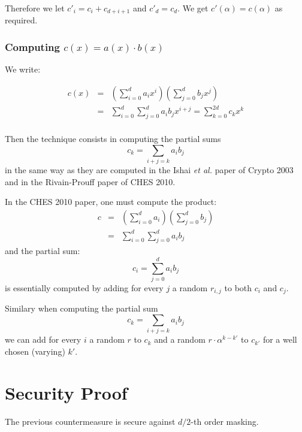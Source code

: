 \documentclass[11pt]{article}
\begin{document}
Therefore we let $c'_i=c_i+c_{d+i+1}$ and $c'_d=c_d$. We get
$c'(\alpha)=c(\alpha)$ as required.

\subsubsection{Computing $c(x)=a(x) \cdot b(x)$}

We write:

\begin{eqnarray*}
c(x) & =& \left(\sum\limits_{i=0}^d a_i x^i \right)
\left(\sum\limits_{j=0}^d b_j x^j \right) \\
& = & \sum\limits_{i=0}^d \sum\limits_{j=0}^d a_i b_j
x^{i+j}=\sum\limits_{k=0}^{2d} c_k x^k\\
\end{eqnarray*}

Then the technique consists in computing the partial sums
$$ c_k=\sum\limits_{i+j=k} a_i b_j $$
in the same way as they are computed in the Ishai {\sl et al.} paper
of Crypto 2003 and in the Rivain-Prouff paper of CHES 2010. 

In the CHES 2010 paper, one must compute the product:
\begin{eqnarray*}
 c&=&\left(\sum\limits_{i=0}^d a_i  \right)
\left(\sum\limits_{j=0}^d b_j  \right) \\
& = & \sum\limits_{i=0}^d \sum\limits_{j=0}^d a_i b_j
\end{eqnarray*}
and the partial sum:
$$c_i=\sum\limits_{j=0}^d a_i b_j$$
is essentially computed by adding for every $j$ a  random
$r_{i,j}$ to both $c_i$ 
and $c_j$. 

Similary when computing the partial sum
$$ c_k=\sum\limits_{i+j=k} a_i b_{j} $$
we can add for every $i$ a random $r$ to $c_k$ and a random $r \cdot
\alpha^{k-k'}$ to $c_{k'}$ for a well chosen (varying) $k'$.  

\section{Security Proof}

The previous countermeasure is secure against $d/2$-th order masking.
\end{document}
